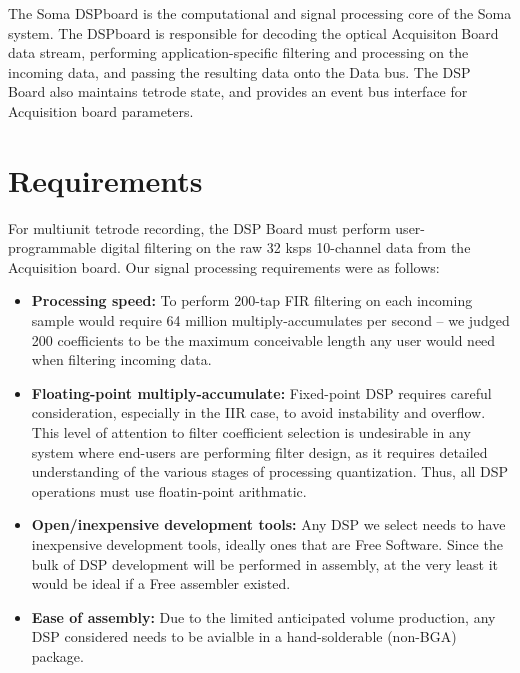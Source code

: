 
The Soma DSPboard is the computational and signal processing core of
the Soma system. The DSPboard is responsible for decoding the optical
Acquisiton Board data stream, performing application-specific
filtering and processing on the incoming data, and passing the
resulting data onto the Data bus. The DSP Board also maintains tetrode
state, and provides an event bus interface for Acquisition board
parameters.

\section{Requirements}
For multiunit tetrode recording, the DSP Board must perform
user-programmable digital filtering on the raw 32 ksps 10-channel data
from the Acquisition board. Our signal processing requirements were as
follows:
    
\begin{itemize}
\item \textbf{Processing speed:} To perform 200-tap FIR filtering on each
  incoming sample would require 64 million multiply-accumulates per
  second -- we judged 200 coefficients to be the maximum conceivable
  length any user would need when filtering incoming data.
  
\item \textbf{Floating-point multiply-accumulate:} Fixed-point DSP requires
  careful consideration, especially in the IIR case, to avoid
  instability and overflow. This level of attention to filter
  coefficient selection is undesirable in any system where end-users
  are performing filter design, as it requires detailed understanding
  of the various stages of processing quantization. Thus, all DSP
  operations must use floatin-point arithmatic.
  
\item \textbf{Open/inexpensive development tools:} Any DSP we select needs to
  have inexpensive development tools, ideally ones that are Free
  Software. Since the bulk of DSP development will be performed in
  assembly, at the very least it would be ideal if a Free assembler
  existed.
  
\item \textbf{Ease of assembly:} Due to the limited anticipated volume
  production, any DSP considered needs to be avialble in a
  hand-solderable (non-BGA) package.
\end{itemize}

